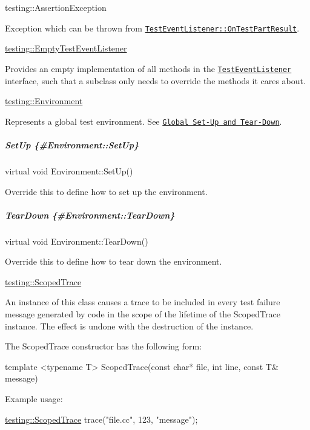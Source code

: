 {\ttfamily testing\+::\+Assertion\+Exception}

Exception which can be thrown from \href{#TestEventListener::OnTestPartResult}{\tt {\ttfamily Test\+Event\+Listener\+::\+On\+Test\+Part\+Result}}.

{\ttfamily \mbox{\hyperlink{classtesting_1_1EmptyTestEventListener}{testing\+::\+Empty\+Test\+Event\+Listener}}}

Provides an empty implementation of all methods in the \href{#TestEventListener}{\tt {\ttfamily Test\+Event\+Listener}} interface, such that a subclass only needs to override the methods it cares about.

{\ttfamily \mbox{\hyperlink{classtesting_1_1Environment}{testing\+::\+Environment}}}

Represents a global test environment. See \href{../advanced.md#global-set-up-and-tear-down}{\tt Global Set-\/\+Up and Tear-\/\+Down}.

\subparagraph*{Set\+Up \{\#\+Environment\+::\+Set\+Up\}}

{\ttfamily virtual void Environment\+::\+Set\+Up()}

Override this to define how to set up the environment.

\subparagraph*{Tear\+Down \{\#\+Environment\+::\+Tear\+Down\}}

{\ttfamily virtual void Environment\+::\+Tear\+Down()}

Override this to define how to tear down the environment.

{\ttfamily \mbox{\hyperlink{classtesting_1_1ScopedTrace}{testing\+::\+Scoped\+Trace}}}

An instance of this class causes a trace to be included in every test failure message generated by code in the scope of the lifetime of the {\ttfamily Scoped\+Trace} instance. The effect is undone with the destruction of the instance.

The {\ttfamily Scoped\+Trace} constructor has the following form\+:


\begin{DoxyCode}
\textcolor{keyword}{template} <\textcolor{keyword}{typename} T>
ScopedTrace(\textcolor{keyword}{const} \textcolor{keywordtype}{char}* file, \textcolor{keywordtype}{int} line, \textcolor{keyword}{const} T& message)
\end{DoxyCode}


Example usage\+:


\begin{DoxyCode}
\mbox{\hyperlink{classtesting_1_1ScopedTrace}{testing::ScopedTrace}} trace(\textcolor{stringliteral}{"file.cc"}, 123, \textcolor{stringliteral}{"message"});
\end{DoxyCode}


